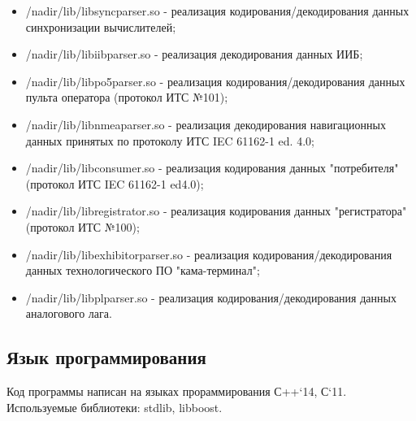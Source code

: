 \begin{itemize}
\item /nadir/lib/libsyncparser.so - реализация кодирования/декодирования данных синхронизации вычислителей;
\item /nadir/lib/libiibparser.so - реализация декодирования данных ИИБ;
\item /nadir/lib/libpo5parser.so - реализация кодирования/декодирования данных пульта оператора (протокол ИТС №101);
\item /nadir/lib/libnmeaparser.so - реализация декодирования навигационных данных принятых по протоколу ИТС IEC 61162-1 ed. 4.0;
\item /nadir/lib/libconsumer.so - реализация кодирования данных "потребителя" (протокол ИТС IEC 61162-1 ed4.0);
\item /nadir/lib/libregistrator.so - реализация кодирования данных "регистратора" (протокол ИТС №100);
\item /nadir/lib/libexhibitorparser.so - реализация кодирования/декодирования данных технологического ПО "кама-терминал";
\item /nadir/lib/libplparser.so - реализация кодирования/декодирования данных аналогового лага.
\end{itemize}
\subsection{Язык программирования}
Код программы написан на языках прораммирования С++`14, С`11.
Используемые библиотеки: stdlib, libboost.
